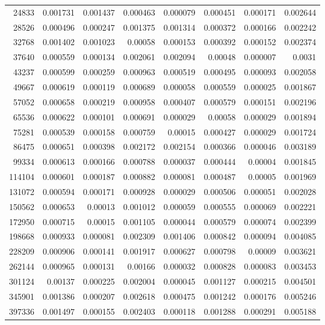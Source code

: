 \begin{longtable}{r r r r r r r r}
24833 & 0.001731 & 0.001437 & 0.000463 & 0.000079 & 0.000451 & 0.000171 & 0.002644 \\
28526 & 0.000496 & 0.000247 & 0.001375 & 0.001314 & 0.000372 & 0.000166 & 0.002242 \\
32768 & 0.001402 & 0.001023 & 0.00058 & 0.000153 & 0.000392 & 0.000152 & 0.002374 \\
37640 & 0.000559 & 0.000134 & 0.002061 & 0.002094 & 0.00048 & 0.000007 & 0.0031 \\
43237 & 0.000599 & 0.000259 & 0.000963 & 0.000519 & 0.000495 & 0.000093 & 0.002058 \\
49667 & 0.000619 & 0.000119 & 0.000689 & 0.000058 & 0.000559 & 0.000025 & 0.001867 \\
57052 & 0.000658 & 0.000219 & 0.000958 & 0.000407 & 0.000579 & 0.000151 & 0.002196 \\
65536 & 0.000622 & 0.000101 & 0.000691 & 0.000029 & 0.00058 & 0.000029 & 0.001894 \\
75281 & 0.000539 & 0.000158 & 0.000759 & 0.00015 & 0.000427 & 0.000029 & 0.001724 \\
86475 & 0.000651 & 0.000398 & 0.002172 & 0.002154 & 0.000366 & 0.000046 & 0.003189 \\
99334 & 0.000613 & 0.000166 & 0.000788 & 0.000037 & 0.000444 & 0.00004 & 0.001845 \\
114104 & 0.000601 & 0.000187 & 0.000882 & 0.000081 & 0.000487 & 0.00005 & 0.001969 \\
131072 & 0.000594 & 0.000171 & 0.000928 & 0.000029 & 0.000506 & 0.000051 & 0.002028 \\
150562 & 0.000653 & 0.00013 & 0.001012 & 0.000059 & 0.000555 & 0.000069 & 0.002221 \\
172950 & 0.000715 & 0.00015 & 0.001105 & 0.000044 & 0.000579 & 0.000074 & 0.002399 \\
198668 & 0.000933 & 0.000081 & 0.002309 & 0.001406 & 0.000842 & 0.000094 & 0.004085 \\
228209 & 0.000906 & 0.000141 & 0.001917 & 0.000627 & 0.000798 & 0.00009 & 0.003621 \\
262144 & 0.000965 & 0.000131 & 0.00166 & 0.000032 & 0.000828 & 0.000083 & 0.003453 \\
301124 & 0.00137 & 0.000225 & 0.002004 & 0.000045 & 0.001127 & 0.000215 & 0.004501 \\
345901 & 0.001386 & 0.000207 & 0.002618 & 0.000475 & 0.001242 & 0.000176 & 0.005246 \\
397336 & 0.001497 & 0.000155 & 0.002403 & 0.000118 & 0.001288 & 0.000291 & 0.005188 \\

\end{longtable}
